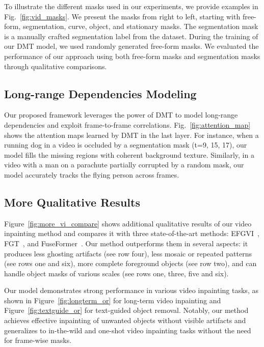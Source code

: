 \documentclass[10pt,twocolumn,letterpaper]{article}
\begin{document}
To illustrate the different masks used in our experiments, we provide examples in Fig.~\ref{fig:vid_masks}. We present the masks from right to left, starting with free-form, segmentation, curve, object, and stationary masks. The segmentation mask is a manually crafted segmentation label from the dataset. During the training of our DMT model, we used randomly generated free-form masks. We evaluated the performance of our approach using both free-form masks and segmentation masks through qualitative comparisons.

\subsection{Long-range Dependencies Modeling}

Our proposed framework leverages the power of DMT to model long-range dependencies and exploit frame-to-frame correlations. Fig.~\ref{fig:attention_map} shows the attention maps learned by DMT in the last layer. For instance, when a running dog in a video is occluded by a segmentation mask (t=9, 15, 17), our model fills the missing regions with coherent background texture. Similarly, in a video with a man on a parachute partially corrupted by a random mask, our model accurately tracks the flying person across frames.



\subsection{More Qualitative Results}
 
Figure~\ref{fig:more_vi_compare} shows additional qualitative results of our video inpainting method and compares it with three state-of-the-art methods: EFGVI~\cite{li22e2fgvi}, FGT~\cite{zhang22flow}, and FuseFormer~\cite{liu21fuseformer}. Our method outperforms them in several aspects: it produces less ghosting artifacts (see row four), less mosaic or repeated patterns (see rows one and six), more complete foreground objects (see row two), and can handle object masks of various scales (see rows one, three, five and six).

Our model demonstrates strong performance in various video inpainting tasks, as shown in Figure~\ref{fig:longterm_or} for long-term video inpainting and Figure~\ref{fig:textguide_or} for text-guided object removal. Notably, our method achieves effective inpainting of unwanted objects without visible artifacts and generalizes to in-the-wild and one-shot video inpainting tasks without the need for frame-wise masks.
\end{document}
